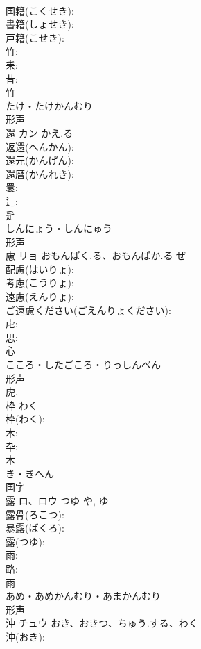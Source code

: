 \documentclass[8pt]{extreport}
\begin{document}
\begin{CJK}{UTF8}{min}
\\	国籍(こくせき): 
\\	書籍(しょせき): 
\\	戸籍(こせき): 
\\	竹: 
\\	耒: 
\\	昔: 
\\	竹	
\\	たけ・たけかんむり	
\\	形声 
\\	還	カン	かえ.る		
\\	返還(へんかん): 
\\	還元(かんげん): 
\\	還暦(かんれき): 
\\	睘: 
\\	辶: 
\\	辵	
\\	しんにょう・しんにゅう	
\\	形声 
\\	慮	リョ	おもんぱく.る、おもんぱか.る	ぜ	
\\	配慮(はいりょ): 
\\	考慮(こうりょ): 
\\	遠慮(えんりょ): 
\\	ご遠慮ください(ごえんりょください): 
\\	虍: 
\\	思: 
\\	心	
\\	こころ・したごころ・りっしんべん	
\\	形声 
\\	虎.
\\	枠		わく		
\\	枠(わく): 
\\	木: 
\\	卆: 
\\	木	
\\	き・きへん	
\\	国字 
\\	露	ロ、ロウ	つゆ	や, ゆ	
\\	露骨(ろこつ): 
\\	暴露(ばくろ): 
\\	露(つゆ): 
\\	雨: 
\\	路: 
\\	雨	
\\	あめ・あめかんむり・あまかんむり	
\\	形声 
\\	沖	チュウ	おき、おきつ、ちゅう.する、わく		
\\	沖(おき): 

\end{CJK}
\end{document}
